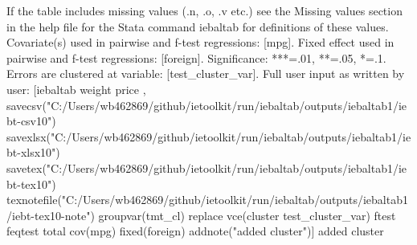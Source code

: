 If the table includes missing values (.n, .o, .v etc.) see the Missing values section in the help file for the Stata command iebaltab for definitions of these values. Covariate(s) used in pairwise and f-test regressions: [mpg]. Fixed effect used in pairwise and f-test regressions: [foreign]. Significance: ***=.01, **=.05, *=.1. Errors are clustered at variable: [test\_cluster\_var]. Full user input as written by user: [iebaltab weight price , savecsv("C:/Users/wb462869/github/ietoolkit/run/iebaltab/outputs/iebaltab1/iebt-csv10") savexlsx("C:/Users/wb462869/github/ietoolkit/run/iebaltab/outputs/iebaltab1/iebt-xlsx10") savetex("C:/Users/wb462869/github/ietoolkit/run/iebaltab/outputs/iebaltab1/iebt-tex10") texnotefile("C:/Users/wb462869/github/ietoolkit/run/iebaltab/outputs/iebaltab1/iebt-tex10-note") groupvar(tmt\_cl) replace vce(cluster test\_cluster\_var) ftest feqtest total cov(mpg) fixed(foreign) addnote("added cluster")] added cluster

